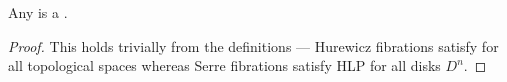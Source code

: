 \begin{lemma} \label{lemma:hurewicz_fibrations_are_serre_fibrations}
    Any  is a .
\end{lemma}
\begin{proof}
    This holds trivially from the definitions --- Hurewicz fibrations satisfy  for all topological spaces whereas Serre fibrations satisfy HLP for all disks $D^n$. 
\end{proof}